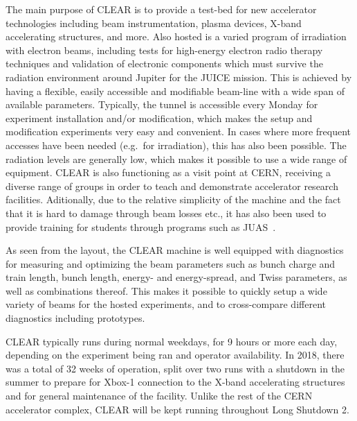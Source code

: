\documentclass[a4paper,
               keeplastbox,   %
               ]{jacow}
\begin{document}
The main purpose of CLEAR is to provide a test-bed for new accelerator technologies including beam instrumentation, plasma devices, X-band accelerating structures, and more.
Also hosted is a varied program of irradiation with electron beams, including tests for high-energy electron radio therapy techniques and validation of electronic components which must survive the radiation environment around Jupiter for the JUICE mission.
This is achieved by having a flexible, easily accessible and modifiable beam-line with a wide span of available parameters.
Typically, the tunnel is accessible every Monday for experiment installation and/or modification, which makes the setup and modification experiments very easy and convenient.
In cases where more frequent accesses have been needed (e.g.\ for irradiation), this has also been possible.
The radiation levels are generally low, which makes it possible to use a wide range of equipment.
CLEAR is also functioning as a visit point at CERN, receiving a diverse range of groups in order to teach and demonstrate accelerator research facilities.
Aditionally, due to the relative simplicity of the machine and the fact that it is hard to damage through beam losses etc., it has also been used to provide training for students through programs such as JUAS~\cite{JUAS19}.

As seen from the layout, the CLEAR machine is well equipped with diagnostics~\cite{HelenPHELMA} for measuring and optimizing the beam parameters such as bunch charge and train length, bunch length, energy- and energy-spread, and Twiss parameters, as well as combinations thereof.
This makes it possible to quickly setup a wide variety of beams for the hosted experiments, and to cross-compare different diagnostics including prototypes.

CLEAR typically runs during normal weekdays, for 9 hours or more each day, depending on the experiment being ran and operator availability.
In 2018, there was a total of 32 weeks of operation, split over two runs with a shutdown in the summer to prepare for Xbox-1 connection to the X-band accelerating structures and for general maintenance of the facility.
Unlike the rest of the CERN accelerator complex, CLEAR will be kept running throughout Long Shutdown 2.
\end{document}
